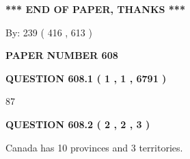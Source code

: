 \documentclass[12pt]{article}
\begin{document}
 
 
 
   
   
 \vspace{0.2in}
 
   
   
   
   
\vspace{1.0in} 
{\textbf{\large{ *** END OF PAPER, THANKS *** }}} 
   
   
\hspace{1.0in} By: 
 239 ( 416 ,  613 )
   
   
   
   
\newpage 
\setcounter{page}{ 
   608001 } 
   
   
   
   
 {\textbf{ \Large{ PAPER NUMBER  608  }}}
   
   
\vspace{0.2in}
   
   
   
   
   
   
 \vspace{0.2in}
 
 
 
 
   
   
  
\vspace{0.2in}
  
{\textbf{\Large{QUESTION
608.1 
 ( 1 , 1 , 6791 )
}}}
  
  
 
 
\noindent{}

87
 
 
  
\vspace{0.2in}
  
{\textbf{\Large{QUESTION
608.2 
 ( 2 , 2 , 3 )
}}}
  
  
 
 
\noindent{}
 
 
Canada has 10  provinces and 3 territories.
 
 
 
 
   
   
 \vspace{0.2in}
 
   
   
\end{document}
